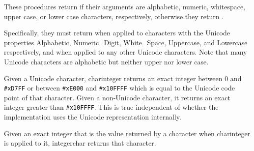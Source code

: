 \begin{entry}{%
}

These procedures return \schtrue{} if their arguments are alphabetic,
numeric, whitespace, upper case, or lower case characters, respectively,
otherwise they return \schfalse.  

Specifically, they must return \schtrue{} when applied to characters with
the Unicode properties Alphabetic, Numeric\_Digit, White\_Space, Uppercase, and
Lowercase respectively, and \schfalse{} when applied to any other Unicode
characters.  Note that many Unicode characters are alphabetic but neither
upper nor lower case.

\end{entry}


%


\begin{entry}{%
}

Given a Unicode character, 
{\cf char\coerce{}integer} returns an exact integer 
between 0 and {\tt \#xD7FF} or 
between {\tt \#xE000} and {\tt \#x10FFFF} 
which is equal to the Unicode code point of that character.
Given a non-Unicode character, 
it returns an exact integer greater than {\tt \#x10FFFF}.  
This is true independent of whether the implementation uses
the Unicode representation internally.

Given an exact integer that is the value returned by
a character when {\cf char\coerce{}integer} is applied to it, {\cf integer\coerce{}char}
returns that character.
%
%
%
%
%
\end{entry}



